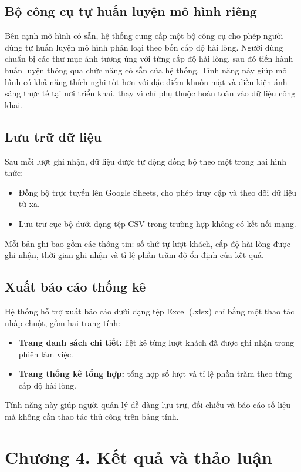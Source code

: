 \documentclass{iaesarticle}
\begin{document}
\subsection{Bộ công cụ tự huấn luyện mô hình riêng}
Bên cạnh mô hình có sẵn, hệ thống cung cấp một bộ công cụ cho phép người dùng tự huấn luyện mô hình phân loại theo bốn cấp độ hài lòng. Người dùng chuẩn bị các thư mục ảnh tương ứng với từng cấp độ hài lòng, sau đó tiến hành huấn luyện thông qua chức năng có sẵn của hệ thống. Tính năng này giúp mô hình có khả năng thích nghi tốt hơn với đặc điểm khuôn mặt và điều kiện ánh sáng thực tế tại nơi triển khai, thay vì chỉ phụ thuộc hoàn toàn vào dữ liệu công khai.

\subsection{Lưu trữ dữ liệu}
Sau mỗi lượt ghi nhận, dữ liệu được tự động đồng bộ theo một trong hai hình thức:
\begin{itemize}[topsep=0.3ex, itemsep=0.3ex, parsep=0.2ex]
	\item[-] Đồng bộ trực tuyến lên Google Sheets, cho phép truy cập và theo dõi dữ liệu từ xa.
	\item[-] Lưu trữ cục bộ dưới dạng tệp CSV trong trường hợp không có kết nối mạng.
\end{itemize}
Mỗi bản ghi bao gồm các thông tin: số thứ tự lượt khách, cấp độ hài lòng được ghi nhận, thời gian ghi nhận và tỉ lệ phần trăm độ ổn định của kết quả.

\subsection{Xuất báo cáo thống kê}
Hệ thống hỗ trợ xuất báo cáo dưới dạng tệp Excel (.xlsx) chỉ bằng một thao tác nhấp chuột, gồm hai trang tính:
\begin{itemize}[topsep=0.3ex, itemsep=0.3ex, parsep=0.2ex]
	\item[-] \textbf{Trang danh sách chi tiết:} liệt kê từng lượt khách đã được ghi nhận trong phiên làm việc.
	\item[-] \textbf{Trang thống kê tổng hợp:} tổng hợp số lượt và tỉ lệ phần trăm theo từng cấp độ hài lòng.
\end{itemize}
Tính năng này giúp người quản lý dễ dàng lưu trữ, đối chiếu và báo cáo số liệu mà không cần thao tác thủ công trên bảng tính.

\section{Chương 4. Kết quả và thảo luận}
\label{sec:results}
\end{document}

